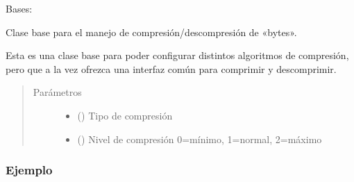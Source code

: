 \documentclass[a4paper,12pt,spanish]{sphinxmanual}
\begin{document}
\begin{fulllineitems}
\label{\detokenize{openerm.Compressor:openerm.Compressor.Compressor}}
Bases: 

Clase base para el manejo de compresión/descompresión de «bytes».

Esta es una clase base para poder configurar distintos algoritmos de
compresión, pero que a la vez ofrezca una interfaz común para comprimir
y descomprimir.
\begin{quote}\begin{description}
\item[{Parámetros}] \leavevmode\begin{itemize}
\item {} 
 () \textendash{} Tipo de compresión

\item {} 
 () \textendash{} Nivel de compresión 0=mínimo, 1=normal, 2=máximo

\end{itemize}

\end{description}\end{quote}
\subsubsection*{Ejemplo}

\begin{sphinxVerbatim}[commandchars=\\\{\}]
   
   
  
\end{sphinxVerbatim}


\end{fulllineitems}
\end{document}

